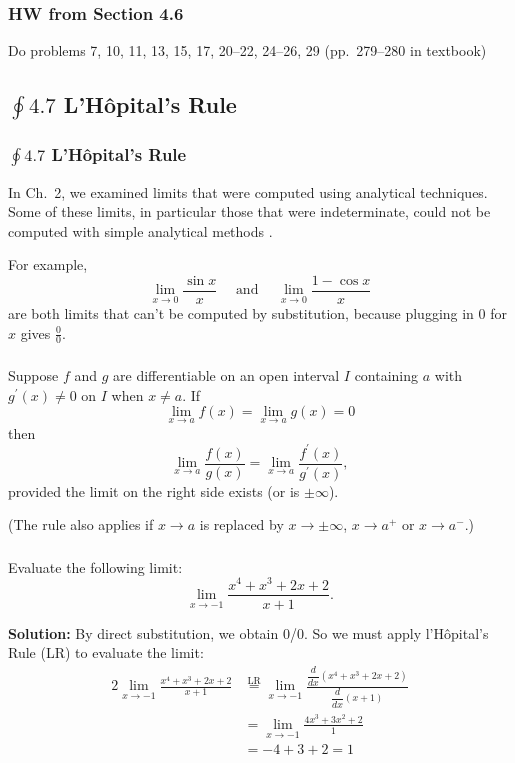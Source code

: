 \documentclass[14pt]{beamer}
\begin{document}
\begin{frame}
\frametitle{HW from Section 4.6}
Do problems 7, 10, 11, 13, 15, 17, 20--22, 24--26, 29 (pp.\ 279--280 in textbook)
\end{frame}


\begin{frame}
\subsection[$\oint 4.7$ L'H\^{o}pital's Rule]{$\oint 4.7$ L'H\^{o}pital's Rule}
\frametitle{$\oint 4.7$ L'H\^{o}pital's Rule}
\small
In Ch.\ 2, we examined limits that were computed using analytical techniques.  Some of these limits, in particular those that were indeterminate, could not be computed with simple analytical methods%
.

\vspace{1pc}
For example, 
\vspace{-0.5pc}
\[\lim_{x \to 0} \frac{\sin x}{x}\quad\text{ and }\quad \lim_{x \to 0} \frac{1-\cos x}{x}\] 
are both limits that can't be computed by substitution, because plugging in 0 for $x$ gives $\frac{0}{0}$.
\end{frame}

\begin{frame}
\frametitle{}
\small
\begin{thm}
Suppose $f$ and $g$ are differentiable on an open interval $I$ containing $a$ with $g^{\prime}(x) \ne 0$ on $I$ when $x \ne a$.  If 
$$\lim_{x \to a} f(x)=\lim_{x \to a} g(x)=0$$
then
$$\lim_{x \to a} \frac{f(x)}{g(x)}=\lim_{x \to a} \frac{f^{\prime}(x)}{g^{\prime}(x)},$$
provided the limit on the right side exists (or is $\pm \infty$).
\end{thm}

\vspace{1pc}
(The rule also applies if $x \to a$ is replaced by $x \to \pm \infty$, $x \to a^+$ or $x \to a^-$.)
\end{frame}

\begin{frame}%
\frametitle{}
\small
\begin{ex} Evaluate the following limit:  
\vspace{-0.5pc}
\[\lim_{x \to -1} \frac{x^4+x^3+2x+2}{x+1}.\]
\end{ex}

\footnotesize
{\bf Solution:}  By direct substitution, we obtain 0/0.  So we must apply l'H\^{o}pital's Rule (LR) to evaluate the limit:
\begin{alignat*}{2}
\lim_{x \to -1} \frac{x^4+x^3+2x+2}{x+1} &\overset{\text{LR}}{=} \lim_{x \to -1} \frac{ \dfrac{d}{dx} \left(x^4+x^3+2x+2 \right)}{\dfrac{d}{dx} (x+1)} \\
&= \lim_{x \to -1} \frac{4x^3+3x^2+2}{1} \\
&= -4+3+2 = 1
\end{alignat*}
\end{frame}
\end{document}

